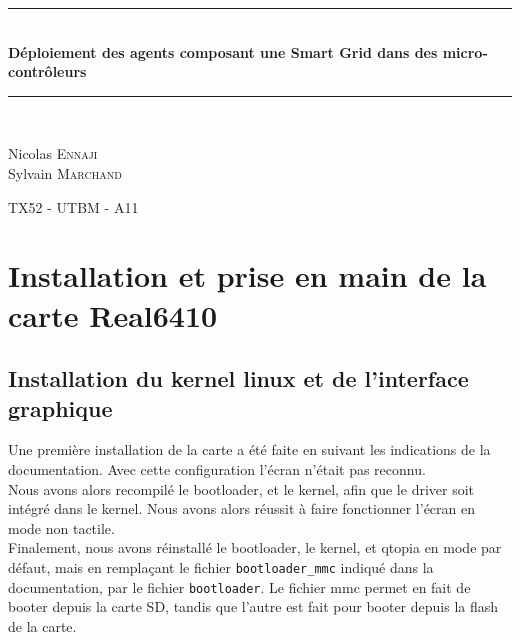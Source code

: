 \documentclass[a4,french,12pt]{article}
\newcommand{\HRule}{\rule{\linewidth}{0.5mm}}
\begin{document}
\begin{titlepage}
\begin{center}

\HRule \\[0.4cm]
{ \huge \bfseries Déploiement des agents composant une Smart Grid dans des micro-contrôleurs}\\[0.4cm]
 
\HRule \\[1.5cm]
\begin{minipage}{0.4\textwidth}
\begin{flushleft} \large

Nicolas \textsc{Ennaji} \\
Sylvain \textsc{Marchand} 

\end{flushleft}
\end{minipage}

\vfill 
{\large TX52 - UTBM - A11}

\end{center}
\end{titlepage}

\tableofcontents

\newpage

\section{Installation et prise en main de la carte Real6410}
\subsection{Installation du kernel linux et de l'interface graphique}
Une première installation de la carte a été faite en suivant les indications de la documentation. Avec cette configuration 
l'écran n'était pas reconnu. \\
Nous avons alors recompilé le bootloader, et le kernel, afin que le driver soit intégré dans le kernel. Nous avons alors 
réussit à faire fonctionner l'écran en mode non tactile. \\
Finalement, nous avons réinstallé le bootloader, le kernel, et qtopia en mode par défaut, mais en remplaçant le fichier 
\texttt{bootloader\_mmc} indiqué dans la documentation, par le fichier \texttt{bootloader}. Le fichier mmc permet en fait de booter depuis la 
carte SD, tandis que l'autre est fait pour booter depuis la flash de la carte. %
\end{document}
